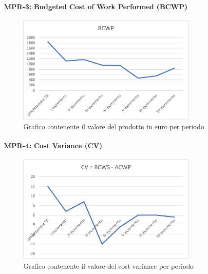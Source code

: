 \paragraph{MPR-3: Budgeted Cost of Work Performed (BCWP)}\label{_BCWP}
\begin{figure}[!htb]
    \centering
    \includegraphics[width=0.8\textwidth]{res/images/metriche_costi/BCWP.png}
    \caption{Grafico contenente il valore del prodotto in euro per periodo}
\end{figure}



\paragraph{MPR-4: Cost Variance (CV)}\label{_CV}
\begin{figure}[!htb]
    \centering
    \includegraphics[width=0.8\textwidth]{res/images/metriche_costi/CV.png}
    \caption{Grafico contenente il valore del cost variance per periodo}
\end{figure}
\newpage
